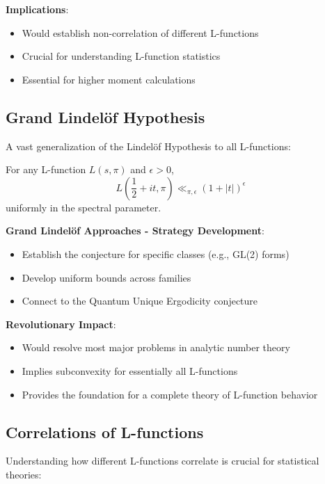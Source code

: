 \textbf{Implications}:
\begin{itemize}
\item Would establish non-correlation of different L-functions
\item Crucial for understanding L-function statistics
\item Essential for higher moment calculations
\end{itemize}

\subsection{Grand Lindelöf Hypothesis}
\label{subsec:grand_lindelof}

A vast generalization of the Lindelöf Hypothesis to all L-functions:

\begin{conjecture}
For any L-function $L(s, \pi)$ and $\epsilon > 0$,
\begin{equation}
L\left(\frac{1}{2} + it, \pi\right) \ll_{\pi,\epsilon} (1 + |t|)^\epsilon
\end{equation}
uniformly in the spectral parameter.
\end{conjecture}

\noindent\textbf{Grand Lindelöf Approaches - Strategy Development}:
\begin{itemize}
\item Establish the conjecture for specific classes (e.g., GL(2) forms)
\item Develop uniform bounds across families
\item Connect to the Quantum Unique Ergodicity conjecture
\end{itemize}

\textbf{Revolutionary Impact}:
\begin{itemize}
\item Would resolve most major problems in analytic number theory
\item Implies subconvexity for essentially all L-functions
\item Provides the foundation for a complete theory of L-function behavior
\end{itemize}

\subsection{Correlations of L-functions}
\label{subsec:l_function_correlations}

Understanding how different L-functions correlate is crucial for statistical theories:

